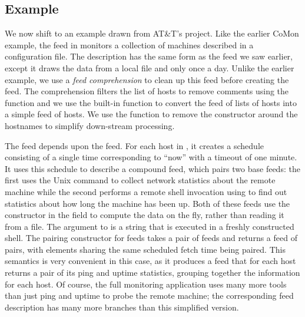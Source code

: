 \subsection{\vizGems{} Example}
We now shift to an example drawn from AT\&T's \vizGems{} project.  Like
the earlier CoMon example, the  feed in 
monitors a collection of machines described in a configuration file.
The  description has the same form as the  feed
we saw earlier, except it draws the data from a local file and only
once a day.  Unlike the earlier example, we use a \textit{feed
comprehension} to clean up this feed before creating the  feed.
The comprehension filters
the list of hosts to remove comments using the  function
and we use the built-in  function to convert the feed of
lists of hosts into a simple feed of hosts.  We use the 
function to remove the  constructor around the hostnames to
simplify down-stream processing.

The  feed depends upon the  feed.  For each host
 in , it creates a schedule consisting of a single
time corresponding to ``now'' with a timeout of one minute.  It uses
this schedule  to describe a compound feed, which pairs two base
feeds: the first uses the Unix command  to collect network
statistics about the remote machine while the second performs a remote
shell invocation using  to find out statistics about how long
the machine has been up.  Both of these feeds use the 
constructor in the  field to compute the data on the fly,
rather than reading it from a file.  The argument to  is a
string that is executed in a freshly constructed shell.  The pairing
constructor for feeds takes a pair of feeds and returns a feed of
pairs, with elements sharing the same scheduled fetch time being
paired. This semantics is very convenient in this case, as it produces
a feed that for each host returns a pair of its ping and uptime
statistics, grouping together the information for each host. 
Of course, the full \vizGems{} monitoring application
uses many more tools than just ping and uptime to probe the remote
machine; the corresponding feed description has many more branches than this simplified version.



